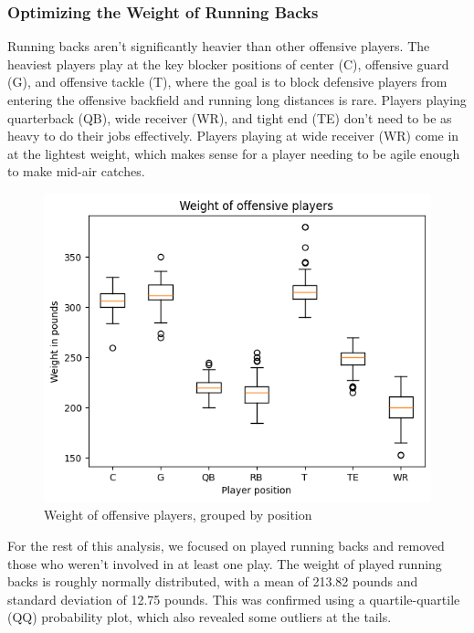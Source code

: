 \documentclass[bibtex, sigconf, hyperref={colorlinks=true,linkcolor=blue,urlcolor=blue}]{acmart}
\begin{document}
\subsubsection{Optimizing the Weight of Running Backs}

Running backs aren't significantly heavier than other offensive players. The
heaviest players play at the key blocker positions of center (C), offensive
guard (G), and offensive tackle (T), where the goal is to block defensive
players from entering the offensive backfield and running long distances is
rare. Players playing quarterback (QB), wide receiver (WR), and tight end (TE)
don't need to be as heavy to do their jobs effectively. Players playing at wide
receiver (WR) come in at the lightest weight, which makes sense for a player
needing to be agile enough to make mid-air catches.

\begin{figure}[h]
  \centering
  \includegraphics[width=\linewidth]{weight-of-offensive-players.png}
  \caption{Weight of offensive players, grouped by position}
\end{figure}

For the rest of this analysis, we focused on played running backs and removed
those who weren't involved in at least one play. The weight of played running
backs is roughly normally distributed, with a mean of 213.82 pounds and standard
deviation of 12.75 pounds. This was confirmed using a quartile-quartile (QQ)
probability plot, which also revealed some outliers at the tails.
\end{document}

